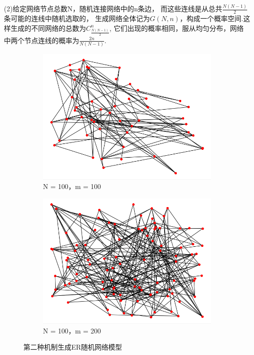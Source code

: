 \documentclass[bachelor,adobefonts]{jnuthesis}
\begin{document}
(2)给定网络节点总数N，随机连接网络中的n条边，
而这些连线是从总共$\frac{N(N-1)}{2}$条可能的连线中随机选取的，
生成网络全体记为$G(N,n)$，构成一个概率空间.这样生成的不同网络的总数为$C_{\frac{N(N-1)}{2}}^{n}$,
它们出现的概率相同，服从均匀分布，网络中两个节点连线的概率为$\frac{2n}{N(N-1)}$.

\begin{figure}[h!]
  \centering 
  \begin{subfigure}[b]{0.49\linewidth}
    \centering
    \includegraphics[width=\linewidth]{WER-3.png}
    \caption{N = 100，m = 100}
  \end{subfigure}
  \begin{subfigure}[b]{0.49\linewidth}
    \centering
    \includegraphics[width=\linewidth]{WER-4.png}
    \caption{N = 100，m = 200}
  \end{subfigure}
  \caption{第二种机制生成ER随机网络模型}
\end{figure}
\end{document}
